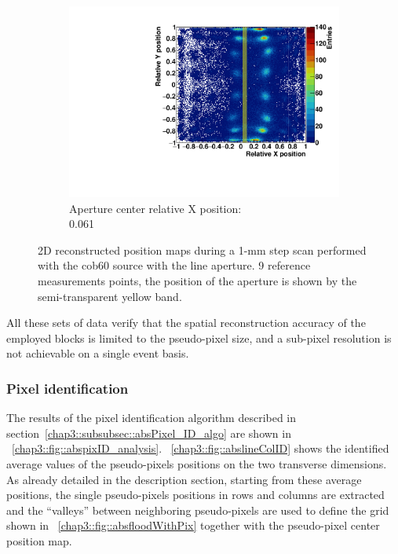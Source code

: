 \begin{figure}
\begin{subfigure}[t]{0.32\textwidth}
\centering
\includegraphics[width=\textwidth]{03_GraphicFiles/chapter3_CLaRySproto/Absorber/images_scan/line_1mm/run00022_floodMap.pdf}
\caption{Aperture center relative X position: \\ 0.061}
\label{chap3::fig::scan_map9_1mm}
\end{subfigure}
\caption{2D reconstructed position maps during a 1-mm step scan performed with the \gls{cob60} source with the line aperture. 9 reference measurements points, the position of the aperture is shown by the semi-transparent yellow band.}
\label{chap3::fig::ScanFloodMap_1mm}
\end{figure}

All these sets of data verify that the spatial reconstruction accuracy of the employed blocks is limited to the pseudo-pixel size, and a sub-pixel resolution is not achievable on a single event basis. 


\subsubsection{Pixel identification}\label{chap3::subsubsec::absPixelID}

The results of the pixel identification algorithm described in section~\ref{chap3::subsubsec::absPixel_ID_algo} are shown in \figurename~\ref{chap3::fig::abspixID_analysis}. \figurename~\ref{chap3::fig::abslineColID} shows the identified average values of the pseudo-pixels positions on the two transverse dimensions. As already detailed in the description section, starting from these average positions, the single pseudo-pixels positions in rows and columns are extracted and the \enquote{valleys} between neighboring pseudo-pixels are used to define the grid shown in \figurename~\ref{chap3::fig::absfloodWithPix} together with the pseudo-pixel center position map.

